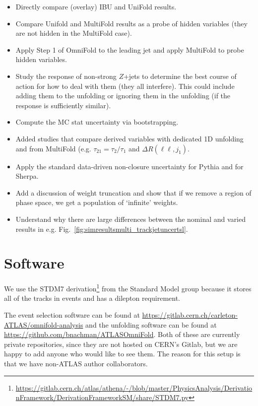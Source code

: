 \documentclass[NOTE, atlasdraft=true, texlive=2016, UKenglish]{\ATLASLATEXPATH atlasdoc}
\begin{document}
\begin{itemize}
\item Directly compare (overlay) IBU and UniFold results.
\item Compare Unifold and MultiFold results as a probe of hidden variables (they are not hidden in the MultiFold case).
\item Apply Step 1 of OmniFold to the leading jet and apply MultiFold to probe hidden variables.
\item Study the response of non-strong $Z$+jets to determine the best course of action for how to deal with them (they all interfere).   This could include adding them to the unfolding or ignoring them in the unfolding (if the response is sufficiently similar).
\item Compute the MC stat uncertainty via bootstrapping.
\item Added studies that compare derived variables with dedicated 1D unfolding and from MultiFold (e.g. $\tau_{21}=\tau_2/\tau_1$ and $\Delta R(\ell\ell,j_1)$.
\item Apply the standard data-driven non-closure uncertainty for Pythia and for Sherpa.
\item Add a discussion of weight truncation and show that if we remove a region of phase space, we get a population of `infinite' weights.
\item Understand why there are large differences between the nominal and varied results in e.g. Fig.~\ref{fig:simresultsmulti_trackjetuncertsl}.
\end{itemize}

\section{Software}

We use the STDM7 derivation\footnote{\url{https://gitlab.cern.ch/atlas/athena/-/blob/master/PhysicsAnalysis/DerivationFramework/DerivationFrameworkSM/share/STDM7.py}} from the Standard Model group because it stores all of the tracks in events and has a dilepton requirement.

The event selection software can be found at \url{https://gitlab.cern.ch/carleton-ATLAS/omnifold-analysis} and the unfolding software can be found at \url{https://github.com/bnachman/ATLASOmniFold}.  Both of these are currently private repositories, since they are not hosted on CERN's Gitlab, but we are happy to add anyone who would like to see them.  The reason for this setup is that we have non-ATLAS author collaborators.
\end{document}
